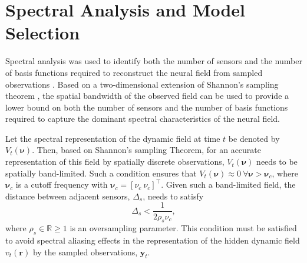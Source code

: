 \documentclass[12pt]{iopart}
\begin{document}
\section{Spectral Analysis and Model Selection}\label{SpectralAnalysisSection} Spectral analysis was used to identify both the number of sensors and the number of basis functions required to reconstruct the neural field from sampled observations \cite{Sanner1992,Scerri2009}. Based on a two-dimensional extension of Shannon's sampling theorem \cite{Peterson1962}, the spatial bandwidth of the observed field can be used to provide a lower bound on both the number of sensors and the number of basis functions required to capture the dominant spectral characteristics of the neural field.

Let the spectral representation of the dynamic field at time $t$ be denoted by $V_t(\boldsymbol{\nu})$. Then, based on Shannon's sampling Theorem, for an accurate representation of this field by spatially discrete observations, $V_t(\boldsymbol{\nu})$ needs to be spatially band-limited. Such a condition ensures that $V_t(\boldsymbol{\nu}) \approx 0 ~ \forall \boldsymbol{\nu} > \boldsymbol{\nu}_c$, where $\boldsymbol{\nu}_c$ is a cutoff frequency with  $\boldsymbol{\nu}_c = [\nu_c ~ \nu_c]^\top$. Given such a band-limited field, the distance between adjacent sensors, $\Delta_s$, needs to satisfy 
\begin{equation}
	\label{eq:MinimumSensorDistance} \Delta_s < \frac{1}{2\rho_s\nu_{c}}, 
\end{equation}
where $\rho_s \in \mathbb{R} \ge 1$ is an oversampling parameter. This condition must be satisfied to avoid spectral aliasing effects in the representation of the hidden dynamic field $v_t(\mathbf{r})$ by the sampled observations, $\mathbf{y}_t$.
\end{document}
